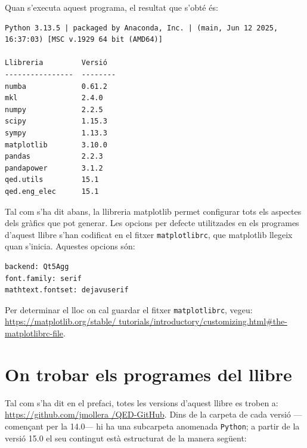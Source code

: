 Quan s'executa aquest programa, el resultat que s'obté és:
\lstset{
	language=,
	numbers=none,
	frame=none
}

\begin{lstlisting}
Python 3.13.5 | packaged by Anaconda, Inc. | (main, Jun 12 2025, 16:37:03) [MSC v.1929 64 bit (AMD64)] 

Llibreria         Versió
----------------  --------
numba             0.61.2
mkl               2.4.0
numpy             2.2.5
scipy             1.15.3
sympy             1.13.3
matplotlib        3.10.0
pandas            2.2.3
pandapower        3.1.2
qed.utils         15.1
qed.eng_elec      15.1
\end{lstlisting} 


Tal com s'ha dit abans, la llibreria matplotlib permet configurar tots els aspectes dels gràfics que pot generar. Les opcions per defecte utilitzades en els programes d'aquest llibre s'han codificat en el fitxer \texttt{matplotlibrc}, que matplotlib llegeix quan s'inicia. Aquestes opcions són:
\begin{lstlisting}
backend: Qt5Agg
font.family: serif
mathtext.fontset: dejavuserif
\end{lstlisting} 

Per determinar el lloc on cal guardar el fitxer \texttt{matplotlibrc}, vegeu: \href{https://matplotlib.org/stable/tutorials/introductory/customizing.html#the-matplotlibrc-file}{https:/\!\!/matplotlib.org/stable/ tutorials/introductory/customizing.html\#the-matplotlibrc-file}.



\section{On trobar els programes del llibre}\label{sec:progs-llibre-internet}

Tal com s'ha dit en el prefaci, totes les versions d'aquest llibre es troben a:
\href{https://github.com/jmollera/QED-GitHub}{https:/\!\!/github.com/jmollera
/QED-GitHub}.  Dins de la carpeta de cada versió ---començant per la 14.0--- hi ha una subcarpeta anomenada \texttt{Python}; a partir de la versió 15.0  el seu contingut està estructurat de la manera següent: 
 
